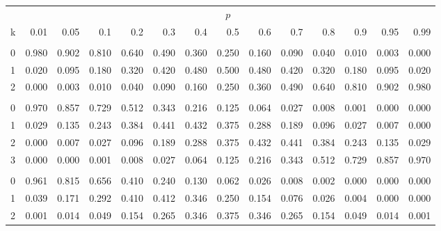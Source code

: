 \documentclass[
]{article}
\begin{document}
\begin{longtable}[t]{lrrrrrrrrrrrrr}
\toprule
\multicolumn{1}{c}{ } & \multicolumn{13}{c}{$p$} \\
\cmidrule(l{3pt}r{3pt}){2-14}
k & 0.01 & 0.05 & 0.1 & 0.2 & 0.3 & 0.4 & 0.5 & 0.6 & 0.7 & 0.8 & 0.9 & 0.95 & 0.99\\
\midrule
\addlinespace[0.3em]
\multicolumn{14}{l}{$n=2$}\\
\hspace{1em}0 & 0.980 & 0.902 & 0.810 & 0.640 & 0.490 & 0.360 & 0.250 & 0.160 & 0.090 & 0.040 & 0.010 & 0.003 & 0.000\\
\hspace{1em}1 & 0.020 & 0.095 & 0.180 & 0.320 & 0.420 & 0.480 & 0.500 & 0.480 & 0.420 & 0.320 & 0.180 & 0.095 & 0.020\\
\hspace{1em}2 & 0.000 & 0.003 & 0.010 & 0.040 & 0.090 & 0.160 & 0.250 & 0.360 & 0.490 & 0.640 & 0.810 & 0.902 & 0.980\\
\addlinespace[0.3em]
\multicolumn{14}{l}{$n=3$}\\
\hspace{1em}0 & 0.970 & 0.857 & 0.729 & 0.512 & 0.343 & 0.216 & 0.125 & 0.064 & 0.027 & 0.008 & 0.001 & 0.000 & 0.000\\
\hspace{1em}1 & 0.029 & 0.135 & 0.243 & 0.384 & 0.441 & 0.432 & 0.375 & 0.288 & 0.189 & 0.096 & 0.027 & 0.007 & 0.000\\
\hspace{1em}2 & 0.000 & 0.007 & 0.027 & 0.096 & 0.189 & 0.288 & 0.375 & 0.432 & 0.441 & 0.384 & 0.243 & 0.135 & 0.029\\
\hspace{1em}3 & 0.000 & 0.000 & 0.001 & 0.008 & 0.027 & 0.064 & 0.125 & 0.216 & 0.343 & 0.512 & 0.729 & 0.857 & 0.970\\
\addlinespace[0.3em]
\multicolumn{14}{l}{$n=4$}\\
\hspace{1em}0 & 0.961 & 0.815 & 0.656 & 0.410 & 0.240 & 0.130 & 0.062 & 0.026 & 0.008 & 0.002 & 0.000 & 0.000 & 0.000\\
\hspace{1em}1 & 0.039 & 0.171 & 0.292 & 0.410 & 0.412 & 0.346 & 0.250 & 0.154 & 0.076 & 0.026 & 0.004 & 0.000 & 0.000\\
\hspace{1em}2 & 0.001 & 0.014 & 0.049 & 0.154 & 0.265 & 0.346 & 0.375 & 0.346 & 0.265 & 0.154 & 0.049 & 0.014 & 0.001\\

\end{longtable}
\end{document}
